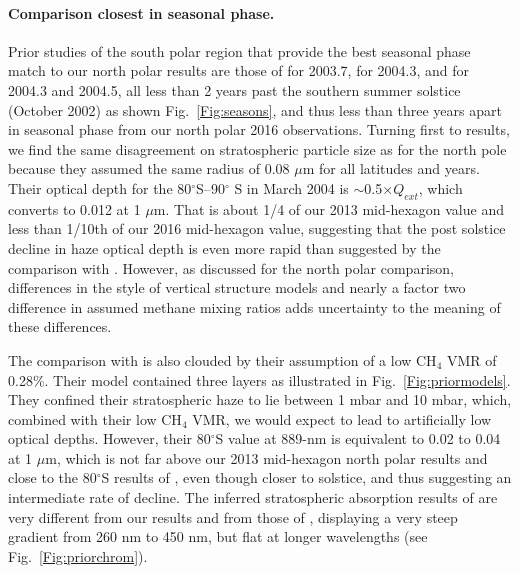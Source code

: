 \documentclass[article,11pt]{emulateapj}
\def\degx{$^\circ$}
\def\mum{$\mu$m }
\def\mumx{$\mu$m}
\def\chf{CH$_4$ }
\begin{document}
\paragraph{Comparison closest in seasonal phase. } Prior studies of the
 south polar region that provide the best seasonal phase match to our
 north polar results are those of \cite{Perez-Hoyos2005} for 2003.7,
 \cite{Kark2005} for 2004.3, and \cite{Sanchez-Lavega2006} for 2004.3
 and 2004.5, all less than 2 years past the southern summer solstice
 (October 2002) as shown Fig.\ \ref{Fig:seasons}, and thus less than
 three years apart in seasonal phase from our north polar 2016
 observations.  Turning first to \cite{Kark2005} results, we find the
 same disagreement on stratospheric particle size as for the north
 pole because they assumed the same radius of 0.08 \mum for all
 latitudes and years.  Their optical depth for the 80\degx S--90\degx
 S in March 2004 is $\sim$0.5$\times Q_{ext}$, which converts to 0.012
 at 1 \mumx.  That is about 1/4 of our 2013 mid-hexagon value and less
 than 1/10th of our 2016 mid-hexagon value, suggesting that the post
 solstice decline in haze optical depth is even more rapid than
 suggested by the comparison with \cite{Sro2020spole}.  However, as
 discussed for the north polar comparison, differences in the style of
 vertical structure models and nearly a factor two difference in
 assumed methane mixing ratios adds uncertainty to the meaning of
 these differences.

The comparison with \cite{Perez-Hoyos2005} is also clouded by their
assumption of a low \chf VMR of 0.28\%. Their model contained three
layers as illustrated in Fig.\ \ref{Fig:priormodels}.  They confined
their stratospheric haze to lie between 1 mbar and 10 mbar, which, combined
with their low \chf VMR, we would expect to lead to artificially low
optical depths.  However, their 80\degx S value at 889-nm is
equivalent to 0.02 to 0.04 at 1 \mumx, which is not far above our 
2013 mid-hexagon north polar results and close to the 80\degx S results
of \cite{Sro2020spole}, even though closer to solstice, and thus
suggesting an intermediate rate of decline. 
The inferred stratospheric absorption results of
\cite{Perez-Hoyos2005} are very different from our results and from
those of \cite{Kark2005}, displaying a very steep gradient from 260 nm
to 450 nm, but flat at longer wavelengths (see
Fig.\ \ref{Fig:priorchrom}).  
\end{document}
